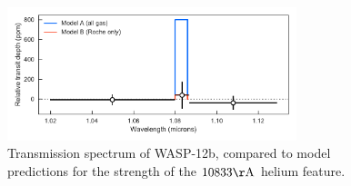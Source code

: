 \documentclass[RNAAS]{aastex62}
\begin{document}
\begin{figure}[b!]
\begin{centering}
\includegraphics[width = 0.75\textwidth]{Figures/fig1.pdf}
\caption{Transmission spectrum of WASP-12b, compared to model predictions for
the strength of the $10833\mathrm{\AA}$ helium feature.}
\end{centering}
\label{fig:spectrum}
\end{figure}




\end{document}
